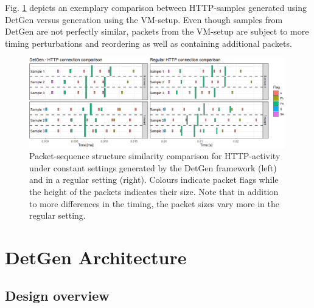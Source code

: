\documentclass[runningheads]{llncs}
\begin{document}
Fig. \ref{Fig:HTTP-seq} depicts an exemplary comparison between HTTP-samples generated using DetGen versus generation using the VM-setup. Even though samples from DetGen are not perfectly similar, packets from the VM-setup are subject to more timing perturbations and reordering as well as containing additional packets.

\begin{figure}
\centering
\includegraphics[width=0.99\textwidth]{images/Detgen_Reg_HTTP_comp_crop.png}
\caption{Packet-sequence structure similarity comparison for HTTP-activity under constant settings generated by the DetGen framework (left) and in a regular setting (right). Colours indicate packet flags while the height of the packets indicates their size. Note that in addition to more differences in the timing, the packet sizes vary more in the regular setting.}\label{Fig:HTTP-seq}
\end{figure}

\section{DetGen Architecture}\label{Sec:Archi}



\subsection{Design overview}
\end{document}

